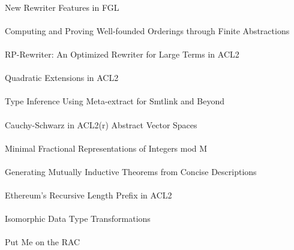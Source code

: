 \documentclass{article}
\begin{document}
\cite{20-swords-fgl} \\
New Rewriter Features in {FGL} \\

\cite{20-sumners-orderings} \\
Computing and Proving Well-founded Orderings through Finite Abstractions \\

\cite{20-temel-rp-rewriter} \\
RP-Rewriter: An Optimized Rewriter for Large Terms in {ACL2} \\

\cite{20-gamboa-quadratic} \\
Quadratic Extensions in {ACL2} \\

\cite{20-peng-inference} \\
Type Inference Using Meta-extract for {Smtlink} and Beyond \\

\cite{20-kwan-cauchy-schwarz} \\
{Cauchy-Schwarz} in {ACL2}(r) Abstract Vector Spaces \\

\cite{20-greve-representations} \\
Minimal Fractional Representations of Integers mod M \\

\cite{20-swords-inductive} \\
Generating Mutually Inductive Theorems from Concise Descriptions \\

\cite{20-coglio-ethereum} \\
Ethereum's Recursive Length Prefix in {ACL2} \\

\cite{20-coglio-isomorphic} \\
Isomorphic Data Type Transformations \\

\cite{20-hardin-rac} \\
Put Me on the {RAC} \\
\end{document}
